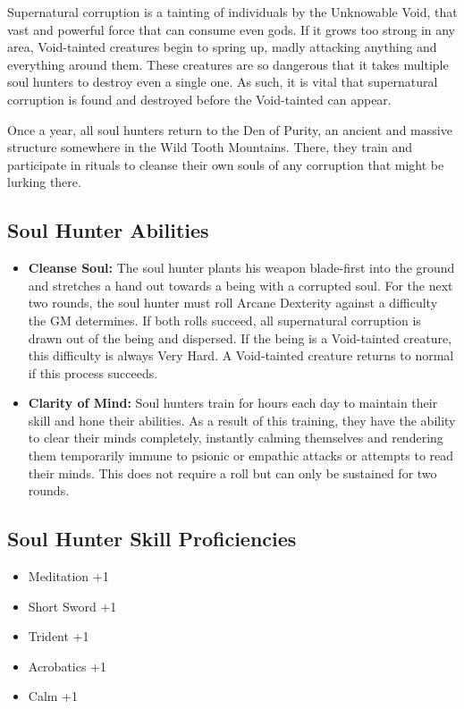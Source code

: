\begin{multicols}{2}
Supernatural corruption is a tainting of individuals by the Unknowable Void, 
that vast and powerful force that can consume even gods. If it grows too strong
in any area, Void-tainted creatures begin to spring up, madly attacking anything
and everything around them. These creatures are so dangerous that it takes
multiple soul hunters to destroy even a single one. As such, it is vital that
supernatural corruption is found and destroyed before the Void-tainted can appear.

Once a year, all soul hunters return to the Den of Purity, an ancient and massive
structure somewhere in the Wild Tooth Mountains. There, they train and
participate in rituals to cleanse their own souls of any corruption that might
be lurking there.

\subsection{Soul Hunter Abilities}

\begin{itemize}
  \item \textbf{Cleanse Soul:} The soul hunter plants his weapon blade-first into
    the ground and stretches a hand out towards a being with a corrupted soul. For
    the next two rounds, the soul hunter must roll Arcane Dexterity against a difficulty
    the GM determines. If both rolls succeed, all supernatural corruption is drawn
    out of the being and dispersed. If the being is a Void-tainted creature, this
    difficulty is always Very Hard. A Void-tainted creature returns to normal if
    this process succeeds.
  \item \textbf{Clarity of Mind:} Soul hunters train for hours each day to maintain
    their skill and hone their abilities. As a result of this training, they have
    the ability to clear their minds completely, instantly calming themselves and rendering
    them temporarily immune to psionic or empathic attacks or attempts to read
    their minds. This does not require a roll but can only be sustained for two rounds.
\end{itemize}

\subsection{Soul Hunter Skill Proficiencies}

\begin{itemize}
  \item Meditation +1
  \item Short Sword +1
  \item Trident +1
  \item Acrobatics +1
  \item Calm +1
\end{itemize}


\end{multicols}
